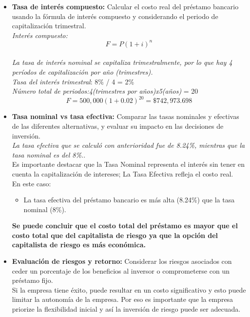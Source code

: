 \documentclass[letterpaper,12pt]{article}
\begin{document}
\begin{sloppypar}
\begin{itemize}
    \item \textbf{Tasa de interés compuesto:} Calcular el costo real del préstamo bancario usando la fórmula de interés compuesto y considerando el periodo de capitalización trimestral. 
    \vspace{0.3cm}\\ 
    \textit{Interés compuesto:}
    $$F = P (1 + i)^{n}$$
    \vspace{0.3cm}\\ 
    \textit{La tasa de interés nominal se capitaliza trimestralmente, por lo que hay 4 períodos de capitalización por año (trimestres).}\\
    \textit{Tasa del interés trimestral}: 8\% / 4 = 2\%\\ 
    \textit{Número total de periodos:4(trimestres por años)x5(años)} = 20
    $$F = 500,000 (1 + 0.02)^{20} = \$742,973.698$$
    \item \textbf{Tasa nominal vs tasa efectiva:} Comparar las tasas nominales y efectivas de las diferentes alternativas, y evaluar su impacto en las decisiones de inversión.
    \vspace{0.3cm}\\ 
    \textit{La tasa efectiva que se calculó con anterioridad fue de 8.24\%, mientras que la tasa nominal es del 8\%.}.
    \vspace{0.3cm}\\ 
    Es importante destacar que la Tasa Nominal representa el interés sin tener en cuenta la capitalización de intereses; La Tasa Efectiva refleja el costo real.
    \vspace{0.3cm}\\
    En este caso:
    \begin{itemize}
        \item La tasa efectiva del préstamo bancario es más alta (8.24\%) que la tasa nominal (8\%).
    \end{itemize}
    \textbf{Se puede concluir que el costo total del préstamo es mayor que el costo total que del capitalista de riesgo ya que la opción del capitalista de riesgo es más económica.}
    \item \textbf{Evaluación de riesgos y retorno:} Considerar los riesgos asociados con ceder un porcentaje de los beneficios al inversor o comprometerse con un préstamo fijo.
    \vspace{0.3cm}\\ 
    Si la empresa tiene éxito, puede resultar en un costo significativo y esto puede limitar la autonomía de la empresa. Por eso es importante que la empresa priorize la flexibilidad inicial y así la inversión de riesgo puede ser adecuada.
\end{itemize}

\end{sloppypar}
\end{document}
